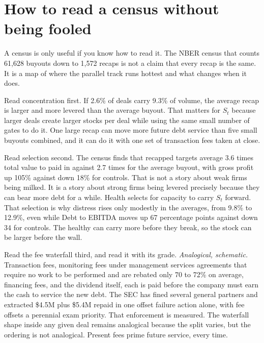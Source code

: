 \section{How to read a census without being fooled}

A census is only useful if you know how to read it. The NBER census that counts 61,628 buyouts down to 1,572 recaps is not a claim that every recap is the same. It is a map of where the parallel track runs hottest and what changes when it does.

Read concentration first. If 2.6\% of deals carry 9.3\% of volume, the average recap is larger and more levered than the average buyout. That matters for $S_t$ because larger deals create larger stocks per deal while using the same small number of gates to do it. One large recap can move more future debt service than five small buyouts combined, and it can do it with one set of transaction fees taken at close.

Read selection second. The census finds that recapped targets average 3.6 times total value to paid in against 2.7 times for the average buyout, with gross profit up 105\% against down 18\% for controls. That is not a story about weak firms being milked. It is a story about strong firms being levered precisely because they can bear more debt for a while. Health selects for capacity to carry $S_t$ forward. That selection is why distress rises only modestly in the averages, from 9.8\% to 12.9\%, even while Debt to EBITDA moves up 67 percentage points against down 34 for controls. The healthy can carry more before they break, so the stock can be larger before the wall.

Read the fee waterfall third, and read it with its grade. \textit{Analogical, schematic.} Transaction fees, monitoring fees under management services agreements that require no work to be performed and are rebated only 70 to 72\% on average, financing fees, and the dividend itself, each is paid before the company must earn the cash to service the new debt. The SEC has fined several general partners and extracted \$4.5M plus \$5.4M repaid in one offset failure action alone, with fee offsets a perennial exam priority. That enforcement is measured. The waterfall shape inside any given deal remains analogical because the split varies, but the ordering is not analogical. Present fees prime future service, every time.

